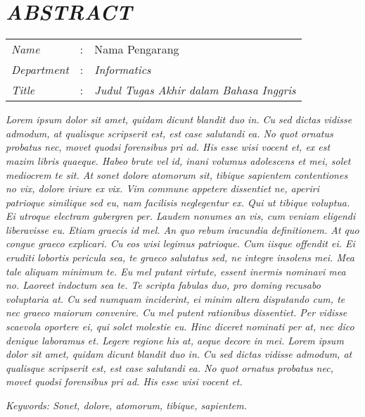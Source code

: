 \chapter*{\textit{ABSTRACT}}

\begin{longtable}{@{}p{2.5cm} l p{10.3cm}}
	\textit{Name} 			& : & Nama Pengarang \\
	\textit{Department}		& : & \textit{Informatics} \\
	\textit{Title}			& : & \textit{Judul Tugas Akhir dalam Bahasa Inggris} \\
	
	
\end{longtable}


\textit{Lorem ipsum dolor sit amet, quidam dicunt blandit duo in. Cu sed dictas vidisse admodum, at qualisque scripserit est, est case salutandi ea. No quot ornatus probatus nec, movet quodsi forensibus pri ad. His esse wisi vocent et, ex est mazim libris quaeque. Habeo brute vel id, inani volumus adolescens et mei, solet mediocrem te sit. At sonet dolore atomorum sit, tibique sapientem contentiones no vix, dolore iriure ex vix. Vim commune appetere dissentiet ne, aperiri patrioque similique sed eu, nam facilisis neglegentur ex. Qui ut tibique voluptua. Ei utroque electram gubergren per. Laudem nonumes an vis, cum veniam eligendi liberavisse eu. Etiam graecis id mel. An quo rebum iracundia definitionem. At quo congue graeco explicari. Cu eos wisi legimus patrioque. Cum iisque offendit ei. Ei eruditi lobortis pericula sea, te graeco salutatus sed, ne integre insolens mei. Mea tale aliquam minimum te. Eu mel putant virtute, essent inermis nominavi mea no. Laoreet indoctum sea te. Te scripta fabulas duo, pro doming recusabo voluptaria at. Cu sed numquam inciderint, ei minim altera disputando cum, te nec graeco maiorum convenire. Cu mel putent rationibus dissentiet. Per vidisse scaevola oportere ei, qui solet molestie eu. Hinc diceret nominati per at, nec dico denique laboramus et. Legere regione his at, aeque decore in mei. Lorem ipsum dolor sit amet, quidam dicunt blandit duo in. Cu sed dictas vidisse admodum, at qualisque scripserit est, est case salutandi ea. No quot ornatus probatus nec, movet quodsi forensibus pri ad. His esse wisi vocent et.}


\noindent \textit{Keywords:  Sonet, dolore, atomorum, tibique, sapientem.}